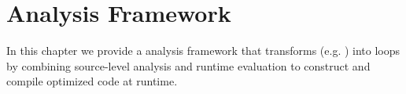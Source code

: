\chapter{Analysis Framework}
In this chapter we provide a \javascript analysis framework that transforms \pipelines (e.g. ) into  loops by combining source-level analysis and runtime evaluation to construct and compile optimized code at runtime.  





